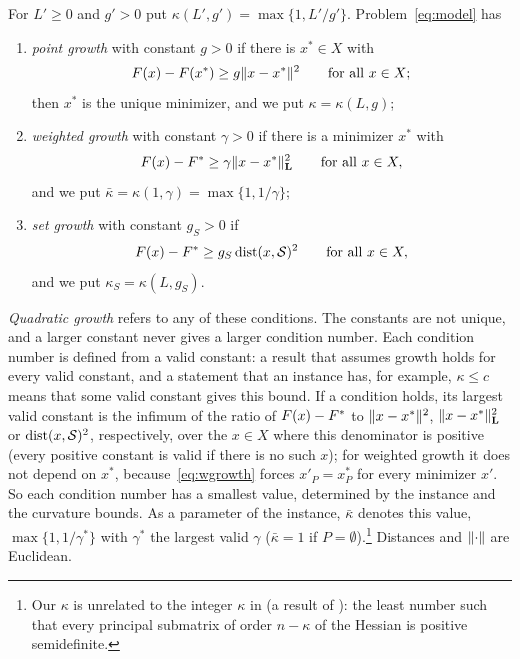 \begin{definition}\label{def:growth}
For $L'\ge0$ and $g'>0$ put $\kappa(L',g')=\max\{1,L'/g'\}$.
Problem~\eqref{eq:model} has
\begin{enumerate}[label=(\alph*)]
\item \emph{point growth} with constant $g>0$ if there is $x^*\in X$ with
\begin{equation}\label{eq:growth}
F(x)-F(x^*)\ge g\lVert x-x^*\rVert^2\qquad\text{for all }x\in X ;
\end{equation}
then $x^*$ is the unique minimizer, and we put $\kappa=\kappa(L,g)$;
\item \emph{weighted growth} with constant $\gamma>0$ if there is a minimizer
$x^*$ with
\begin{equation}\label{eq:wgrowth}
F(x)-F^{*}\ge\gamma\lVert x-x^*\rVert_{\mathbf L}^2\qquad\text{for all }x\in X ,
\end{equation}
and we put $\bar\kappa=\kappa(1,\gamma)=\max\{1,1/\gamma\}$;
\item \emph{set growth} with constant $g_S>0$ if
\begin{equation}\label{eq:setgrowth}
F(x)-F^{*}\ge g_S\operatorname{dist}(x,\mathcal S)^2\qquad\text{for all }x\in X ,
\end{equation}
and we put $\kappa_S=\kappa(L,g_S)$.
\end{enumerate}
\end{definition}

\emph{Quadratic growth} refers to any of these conditions. The constants are
not unique, and a larger constant never gives a larger condition number. Each
condition number is defined from a valid constant: a result that assumes
growth holds for every valid constant, and a statement that an instance has,
for example, $\kappa\le c$ means that some valid constant gives this bound.
If a condition holds, its largest valid constant is the infimum of the ratio
of $F(x)-F^{*}$ to $\lVert x-x^*\rVert^2$, $\lVert x-x^*\rVert_{\mathbf L}^2$ or
$\operatorname{dist}(x,\mathcal S)^2$, respectively, over the $x\in X$ where this
denominator is positive (every positive constant is valid if there is no
such $x$); for weighted growth it
does not depend on $x^*$, because~\eqref{eq:wgrowth} forces $x'_P=x^*_P$
for every minimizer $x'$. So each condition number has a smallest value,
determined by the instance and the curvature bounds. As a parameter of the
instance, $\bar\kappa$ denotes this value, $\max\{1,1/\gamma^*\}$ with
$\gamma^*$ the largest valid $\gamma$ ($\bar\kappa=1$ if
$P=\emptyset$).\footnote{Our $\kappa$ is unrelated to the integer $\kappa$ in
\cite[Lemma~20]{DelPiaKhajavirad2026} (a result of
\cite{Khajavirad2026PolyBox}): the least number such that every principal
submatrix of order $n-\kappa$ of the Hessian is positive semidefinite.}
Distances and $\lVert \cdot\rVert$ are Euclidean.

